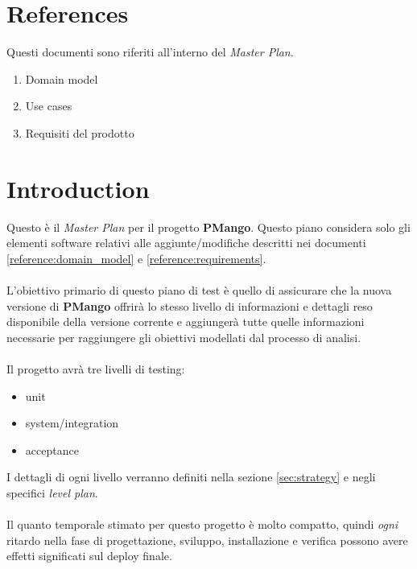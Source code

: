 \section{References}
Questi documenti sono riferiti all'interno del \emph{Master Plan}.
\begin{enumerate}
  \item Domain model \label{reference:domain_model}
  \item Use cases \label{reference:use_cases}
  \item Requisiti del prodotto  \label{reference:requirements}
\end{enumerate}

\section{Introduction}

Questo \`e il \emph{Master Plan} per il progetto \textbf{PMango}. Questo piano
considera solo gli elementi software relativi alle aggiunte/modifiche descritti
nei documenti \ref{reference:domain_model} e \ref{reference:requirements}.
\\ \\
L'obiettivo primario di questo piano di test \`e quello di assicurare che la
nuova versione di \textbf{PMango} offrir\`a lo stesso livello di informazioni e
dettagli reso disponibile della versione corrente e aggiunger\`a tutte quelle
informazioni necessarie per raggiungere gli obiettivi modellati dal processo di
analisi.
\\ \\
Il progetto avr\`a tre livelli di testing: 
\begin{itemize}
  \item unit
  \item system/integration
  \item acceptance
\end{itemize}
I dettagli di ogni livello verranno definiti nella sezione \ref{sec:strategy} e
negli specifici \emph{level plan}. \\ \\
Il quanto temporale stimato per questo progetto \`e molto compatto, quindi
\emph{ogni} ritardo nella fase di progettazione, sviluppo, installazione e
verifica possono avere effetti significati sul deploy finale.